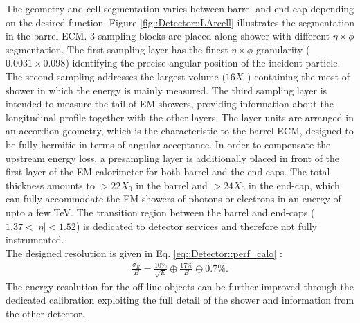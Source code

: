 The geometry and cell segmentation varies between barrel and end-cap depending on the desired function.
Figure \ref{fig::Detector::LArcell} illustrates the segmentation in the barrel ECM. 3 sampling blocks are placed along shower with different $\eta\times\phi$ segmentation.
The first sampling layer has the finest $\eta\times\phi$ granularity ($0.0031\times0.098$) identifying the precise angular position of the incident particle. The second sampling addresses the largest volume ($16X_0$) containing the most of shower in which the energy is mainly measured. The third sampling layer is intended to measure the tail of EM showers, providing information about the longitudinal profile together with the other layers. The layer units are arranged in an accordion geometry, which is the characteristic to the barrel ECM, designed to be fully hermitic in terms of angular acceptance. 
In order to compensate the upstream energy loss, a presampling layer is additionally placed in front of the first layer of the EM calorimeter for both barrel and the end-caps.
The total thickness amounts to $>22X_0$ in the barrel and  $>24X_0$ in the end-cap, which can fully accommodate the EM showers of photons or electrons in an energy of upto a few TeV.
The transition region between the barrel and end-caps ($1.37 < |\eta| <1.52$) is dedicated to detector services and therefore not fully instrumented. \\



The designed resolution is given in Eq. \ref{eq::Detector::perf_calo} \cite{ATLAS_LAr_TDR}:
\begin{align}
\frac{\sigma_E}{E} = \frac{10\%}{\sqrt{E}} \oplus \frac{17\%}{E} \oplus 0.7\%.
\label{eq::Detector::perf_calo}
\end{align}
\noindent The energy resolution for the off-line objects can be further improved through the dedicated calibration exploiting the full detail of the shower and information from the other detector. 



